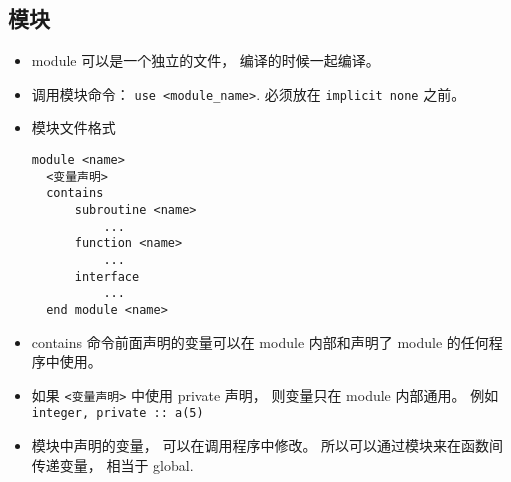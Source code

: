 \subsection{模块}

\begin{itemize}
\item module 可以是一个独立的文件， 编译的时候一起编译。
\item 调用模块命令：  \verb|use <module_name>|.  必须放在 \verb|implicit none| 之前。
\item 模块文件格式
\begin{lstlisting}[language=none]
  module <name>
  <变量声明>
  contains
      subroutine <name>
          ...
      function <name>
          ...
      interface
          ...
  end module <name>
\end{lstlisting}
\item contains 命令前面声明的变量可以在 module 内部和声明了 module 的任何程序中使用。
\item 如果 \verb|<变量声明>| 中使用 private 声明， 则变量只在 module 内部通用。 例如
   \verb|integer, private :: a(5)|
\item 模块中声明的变量， 可以在调用程序中修改。 所以可以通过模块来在函数间传递变量， 相当于 global.
\end{itemize}
